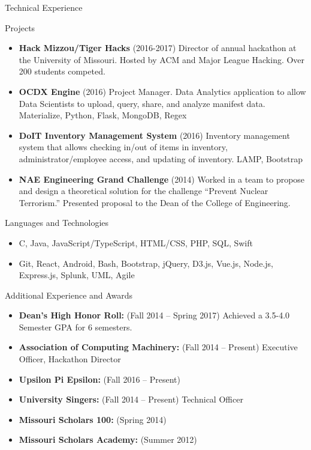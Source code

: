 \documentclass[]{mcdowellcv}
\begin{document}
    \begin{cvsection}{Technical Experience}
        \begin{cvsubsection}{Projects}{}{}
            \begin{itemize}
                \item \textbf{Hack Mizzou/Tiger Hacks} (2016-2017) Director of annual hackathon at the University of Missouri. Hosted by ACM and Major League Hacking. Over 200 students competed.
                \item \textbf{OCDX Engine} (2016) Project Manager. Data Analytics application to allow Data Scientists to upload, query, share, and analyze manifest data. Materialize, Python, Flask, MongoDB, Regex
                \item \textbf{DoIT Inventory Management System} (2016) Inventory management system that allows checking in/out of items in inventory, administrator/employee access, and updating of inventory. LAMP, Bootstrap
                \item \textbf{NAE Engineering Grand Challenge} (2014) Worked in a team to propose and design a theoretical solution for the challenge “Prevent Nuclear Terrorism.” Presented proposal to the Dean of the College of Engineering.
            \end{itemize}
        \end{cvsubsection}

        \begin{cvsubsection}{Languages and Technologies}{}{}
            \begin{itemize}
                \item C, Java, JavaScript/TypeScript, HTML/CSS, PHP, SQL, Swift
                \item Git, React, Android, Bash, Bootstrap, jQuery, D3.js, Vue.js, Node.js, Express.js, Splunk, UML, Agile
            \end{itemize}
        \end{cvsubsection}
    \end{cvsection}
    
    \begin{cvsection}{Additional Experience and Awards}
        \begin{cvsubsection}{}{}{}	
            \begin{itemize}
                \item \textbf{Dean's High Honor Roll:}  (Fall 2014 -- Spring 2017) Achieved a 3.5-4.0 Semester GPA for 6 semesters.
                \item \textbf{Association of Computing Machinery:} (Fall 2014 -- Present) Executive Officer, Hackathon Director
                \item \textbf{Upsilon Pi Epsilon:}  (Fall 2016 -- Present)
                \item \textbf{University Singers:} (Fall 2014 -- Present) Technical Officer
                \item \textbf{Missouri Scholars 100:} (Spring 2014)
                \item \textbf{Missouri Scholars Academy:} (Summer 2012)
            \end{itemize}
        \end{cvsubsection}
    \end{cvsection}
\end{document}
